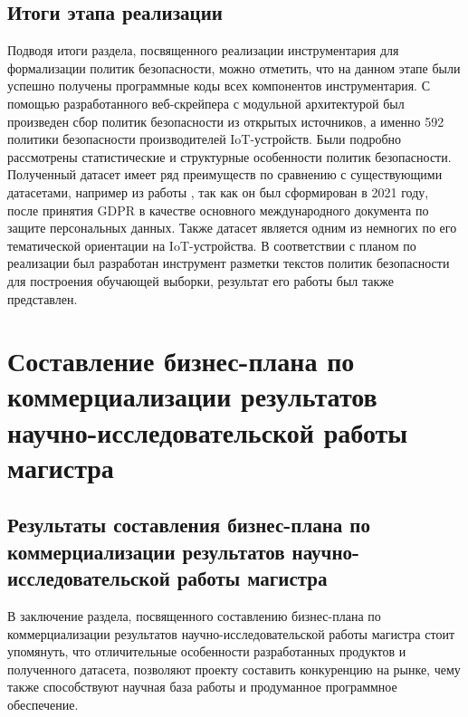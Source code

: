 \documentclass[../main]{subfiles}
\begin{document}
\subsection{Итоги этапа реализации}
Подводя итоги раздела, посвященного реализации инструментария для формализации политик безопасности, можно отметить, что на данном этапе были успешно получены программные коды всех компонентов инструментария. С помощью разработанного веб-скрейпера с модульной архитектурой был произведен сбор политик безопасности из открытых источников, а именно 592 политики безопасности производителей IoT-устройств. Были подробно рассмотрены статистические и структурные особенности политик безопасности. Полученный датасет имеет ряд преимуществ по сравнению с существующими датасетами, например из работы \cite{MDPI18}, так как он был сформирован в 2021 году, после принятия GDPR в качестве основного международного документа по защите персональных данных. Также датасет является одним из немногих по его тематической ориентации на IoT-устройства. В соответствии с планом по реализации был разработан инструмент разметки текстов политик безопасности для построения обучающей выборки, результат его работы был также представлен.

\newpage
\section{Составление бизнес-плана по коммерциализации результатов научно-исследовательской работы магистра}

\subsection{Результаты составления бизнес-плана по коммерциализации результатов научно-исследовательской работы магистра}
В заключение раздела, посвященного составлению бизнес-плана по коммерциализации результатов научно-исследовательской работы магистра стоит упомянуть, что отличительные особенности разработанных продуктов и полученного датасета, позволяют проекту составить конкуренцию на рынке, чему также способствуют научная база работы и продуманное программное обеспечение.
\end{document}
